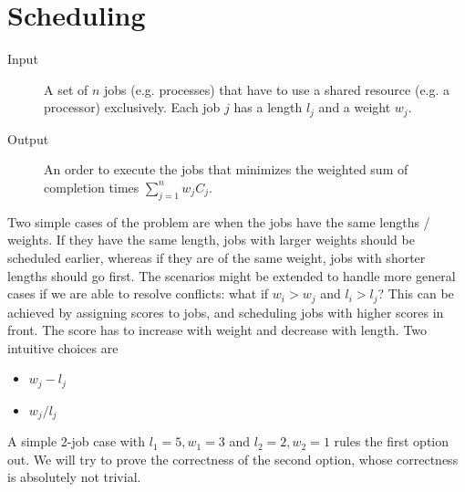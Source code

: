\section{Scheduling}
\begin{description}
\item[Input]A set of $n$ jobs (e.g. processes) that have to use a shared resource (e.g. a processor) exclusively. Each job $j$ has a length $l_j$ and a weight $w_j$. 
\item[Output]An order to execute the jobs that minimizes the weighted sum of completion times $\sum\limits_{j=1}^{n}w_jC_j.$
\end{description}
Two simple cases of the problem are when the jobs have the same lengths / weights. If they have the same length, jobs with larger weights should be scheduled earlier, whereas if they are of the same weight, jobs with shorter lengths should go first. The scenarios might be extended to handle more general cases if we are able to resolve conflicts: what if $w_i>w_j$ and $l_i>l_j$? This can be achieved by assigning scores to jobs, and scheduling jobs with higher scores in front. The score has to increase with weight and decrease with length. Two intuitive choices are 
\begin{itemize}
\item $w_j-l_j$
\item $w_j/l_j$
\end{itemize}
A simple 2-job case with $l_1=5,\allowbreak w_1=3$ and $l_2=2,\allowbreak w_2=1$ rules the first option out. We will try to prove the correctness of the second option, whose correctness is absolutely not trivial.
